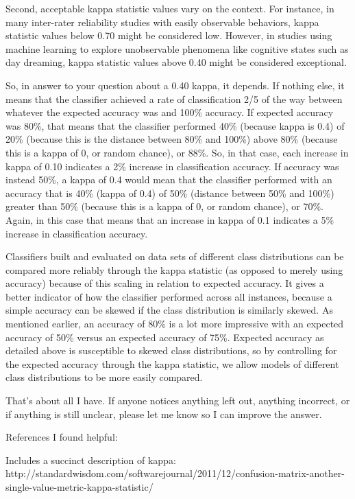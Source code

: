 \documentclass[caret-main.tex]{subfiles}
\begin{document}
Second, acceptable kappa statistic values vary on the context. For instance, in many inter-rater reliability studies with easily observable behaviors, kappa statistic values below 0.70 might be considered low. However, in studies using machine learning to explore unobservable phenomena like cognitive states such as day dreaming, kappa statistic values above 0.40 might be considered exceptional.

So, in answer to your question about a 0.40 kappa, it depends. If nothing else, it means that the classifier achieved a rate of classification 2/5 of the way between whatever the expected accuracy was and 100\% accuracy. If expected accuracy was 80\%, that means that the classifier performed 40\% (because kappa is 0.4) of 20\% (because this is the distance between 80\% and 100\%) above 80\% (because this is a kappa of 0, or random chance), or 88\%. So, in that case, each increase in kappa of 0.10 indicates a 2\% increase in classification accuracy. If accuracy was instead 50\%, a kappa of 0.4 would mean that the classifier performed with an accuracy that is 40\% (kappa of 0.4) of 50\% (distance between 50\% and 100\%) greater than 50\% (because this is a kappa of 0, or random chance), or 70\%. Again, in this case that means that an increase in kappa of 0.1 indicates a 5\% increase in classification accuracy.

Classifiers built and evaluated on data sets of different class distributions can be compared more reliably through the kappa statistic (as opposed to merely using accuracy) because of this scaling in relation to expected accuracy. It gives a better indicator of how the classifier performed across all instances, because a simple accuracy can be skewed if the class distribution is similarly skewed. As mentioned earlier, an accuracy of 80\% is a lot more impressive with an expected accuracy of 50\% versus an expected accuracy of 75\%. Expected accuracy as detailed above is susceptible to skewed class distributions, so by controlling for the expected accuracy through the kappa statistic, we allow models of different class distributions to be more easily compared.

That's about all I have. If anyone notices anything left out, anything incorrect, or if anything is still unclear, please let me know so I can improve the answer.

References I found helpful:

Includes a succinct description of kappa: http://standardwisdom.com/softwarejournal/2011/12/confusion-matrix-another-single-value-metric-kappa-statistic/
\end{document}
